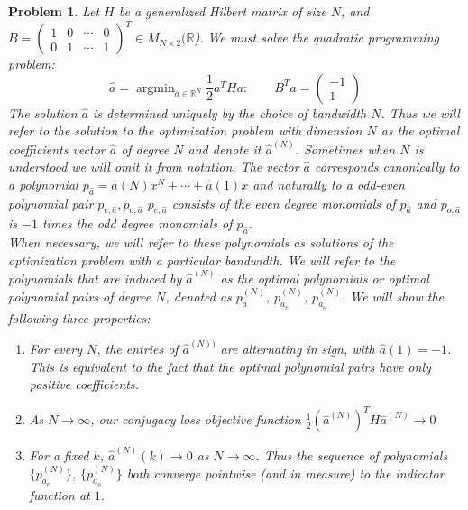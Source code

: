 \documentclass{article}
\newtheorem{prob}[thm]{Problem}
\theoremstyle{definition}
\theoremstyle{remark}
\numberwithin{equation}{section}
\DeclareMathOperator{\argmin}{argmin}
\begin{document}
\begin{prob}\label{quad-prog-problem}
Let $H$ be a generalized Hilbert matrix of size $N$, and $B = \begin{pmatrix} 1 & 0 & \cdots & 0 \\
0 & 1 & \cdots & 1\end{pmatrix} ^T \in M_{N\times 2}(\mathbb{R}$). We must solve the quadratic programming problem: 
\begin{equation}\label{constrained-objective-function}
\hat{a}= \argmin_{a\in\mathbb{R}^N} \frac{1}{2} a^THa : \qquad B^Ta = \begin{pmatrix} -1 \\ 1 \end{pmatrix}
\end{equation} The solution $\hat{a}$ is determined uniquely by the choice of bandwidth $N$. Thus we will refer to the solution to the optimization problem with dimension $N$ as  \emph{the optimal coefficients vector $\hat{a}$ of degree $N$} and denote it $\hat{a}^{(N)}$. Sometimes when $N$ is understood we will omit it from notation. The vector $\hat{a}$ corresponds canonically to a polynomial $p_{\hat{a}} = \hat{a}(N) x^N + \cdots + \hat{a}(1) x$ and naturally to a odd-even polynomial pair $p_{e, \hat{a}}, p_{o, \hat{a}}$ $p_{e,\hat{a}}$ consists of the even degree monomials of $p_{\hat{a}}$ and $p_{o, \hat{a}}$ is $-1$ times the odd degree monomials of $p_{\hat{a}}$. \\
When necessary, we will refer to these polynomials as solutions of the optimization problem with a particular bandwidth. We will refer to the polynomials that are induced by $\hat{a}^(N)$ as the \emph{optimal polynomials or optimal polynomial pairs of degree $N$}, denoted as $p_{\hat{a}}^{(N)}$, $p_{\hat{a}_e}^{(N)}$, $p_{\hat{a}_o}^{(N)}$. 
We will show the following three properties: 
\begin{enumerate}
\item For every $N$, the entries of $\hat{a}^{(N))}$ are alternating in sign, with $\hat{a}(1) = -1$. This is equivalent to the fact that the optimal polynomial pairs have only positive coefficients.

\item As $N\to \infty$, our conjugacy loss objective function $\frac{1}{2} (\hat{a}^{(N)} )^T H \hat{a}^{(N)}\to 0$

\item For a fixed $k$, $\hat{a}^{(N)}(k) \to 0$ as $N\to \infty$. Thus the sequence of polynomials $\{p_{\hat{a}_e}^{(N)}\}$, $\{p_{\hat{a}_o}^{(N)}\}$ both converge pointwise (and in measure) to the indicator function at $1$.
\end{enumerate}
\end{prob}
\end{document}
